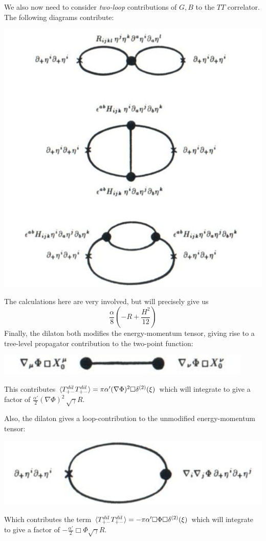 \documentclass[11pt, class=article, crop=false]{standalone}
\begin{document}
\begin{enumerate}
	We also now need to consider \emph{two-loop} contributions of $G, B$ to the $TT$ correlator. The following diagrams contribute:
	\begin{center}
		\includegraphics[scale=0.6]{Figures/Phi1}
	\end{center}
	The calculations here are very involved, but will precisely give us
	\[
		\frac{\alpha}{8} (-R + \frac{H^2}{12})
	\]
	Finally, the dilaton both modifies the energy-momentum tensor, giving rise to a tree-level propagator contribution to the two-point function:
	\begin{center}
		\includegraphics[scale=0.6]{Figures/Phi2}
	\end{center}
	This contributes $\braket{T_{+-}^{dil} T_{+-}^{dil}} = \pi \alpha' (\nabla \Phi)^2 \Box \delta^{(2)}(\xi)$ which will integrate to give a factor of $\frac{\alpha'}{2} (\nabla \Phi)^2\, \sqrt\gamma R$. 
	
	Also, the dilaton gives a loop-contribution to the unmodified energy-momentum tensor:
	\begin{center}
		\includegraphics[scale=0.6]{Figures/Phi3}
	\end{center}
	Which contributes the term $\braket{T_{+-}^{dil} T_{+-}^{dil}} = -\pi \alpha' \Box \Phi \Box \delta^{(2)}(\xi)$ which will integrate to give a factor of $-\frac{\alpha'}{2} \Box \Phi \sqrt\gamma R$.
	

\end{enumerate}
\end{document}
